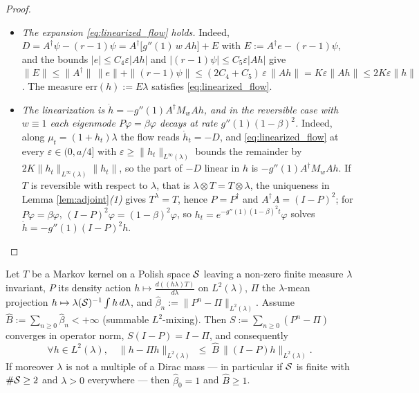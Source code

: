 \begin{proof}
\begin{itemize}
    \item \emph{The expansion \eqref{eq:linearized_flow} holds.} Indeed, $D=A^\dagger\psi-(r-1)\psi=A^\dagger\bigl[g''(1)\,w\,Ah\bigr]+E$ with $E:=A^\dagger e-(r-1)\psi$, and the bounds $|e|\leq C_4\varepsilon|Ah|$ and $|(r-1)\psi|\leq C_5\varepsilon|Ah|$ give $\|E\|\leq\|A^\dagger\|\,\|e\|+\|(r-1)\psi\|\leq(2C_4+C_5)\,\varepsilon\,\|Ah\|=K\varepsilon\|Ah\|\leq2K\varepsilon\|h\|$. The measure $\mathrm{err}(h):=E\lambda$ satisfies \eqref{eq:linearized_flow}.
    \item \emph{The linearization is $\dot h=-g''(1)A^\dagger M_wAh$, and in the reversible case with $w\equiv1$ each eigenmode $P\varphi=\beta\varphi$ decays at rate $g''(1)(1-\beta)^2$.} Indeed, along $\mu_t=(1+h_t)\lambda$ the flow reads $\dot h_t=-D$, and \eqref{eq:linearized_flow} at every $\varepsilon\in(0,a/4]$ with $\varepsilon\geq\|h_t\|_{L^\infty(\lambda)}$ bounds the remainder by $2K\|h_t\|_{L^\infty(\lambda)}\|h_t\|$, so the part of $-D$ linear in $h$ is $-g''(1)A^\dagger M_wAh$. If $T$ is reversible with respect to $\lambda$, that is $\lambda\otimes T=T\otimes\lambda$, the uniqueness in Lemma \ref{lem:adjoint}\emph{(1)} gives $T^\lambda=T$, hence $P=P^\dagger$ and $A^\dagger A=(I-P)^2$; for $P\varphi=\beta\varphi$, $(I-P)^2\varphi=(1-\beta)^2\varphi$, so $h_t=e^{-g''(1)(1-\beta)^2t}\varphi$ solves $\dot h=-g''(1)(I-P)^2h$.
\end{itemize}
\end{proof}

\begin{lemma}\label{lem:sigma_mixing}
Let $T$ be a Markov kernel on a Polish space $\mathcal S$ leaving a non-zero finite measure $\lambda$ invariant, $P$ its density action $h\mapsto\frac{d((h\lambda)T)}{d\lambda}$ on $L^2(\lambda)$, $\Pi$ the $\lambda$-mean projection $h\mapsto\lambda(\mathcal S)^{-1}\int h\,d\lambda$, and $\widehat\beta_n:=\|P^n-\Pi\|_{L^2(\lambda)}$. Assume $\widehat B := \sum_{n\geq0}\widehat\beta_n < +\infty$ (summable $L^2$-mixing). Then $S := \sum_{n\geq0}(P^n - \Pi)$ converges in operator norm, $S(I-P) = I - \Pi$, and consequently
\begin{equation}
    \forall h\in L^2(\lambda),\quad \|h - \Pi h\|_{L^2(\lambda)} \;\leq\; \widehat B\,\|(I-P)h\|_{L^2(\lambda)}.
\end{equation}
If moreover $\lambda$ is not a multiple of a Dirac mass --- in particular if $\mathcal S$ is finite with $\#\mathcal S\geq2$ and $\lambda>0$ everywhere --- then $\widehat\beta_0=1$ and $\widehat B\geq1$.
\end{lemma}

